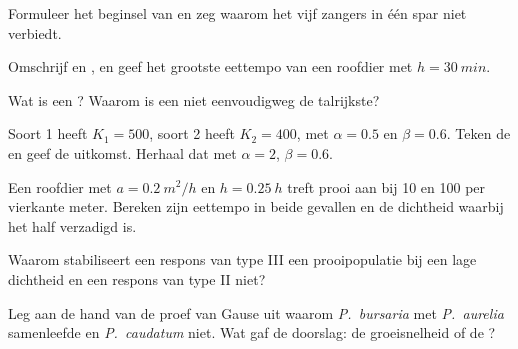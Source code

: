 \begin{exercise}[$\star$]\label{exo:b1:species-interactions:2}
Formuleer het beginsel van  en zeg waarom het vijf
zangers in één spar niet verbiedt.
\end{exercise}

\begin{exercise}[$\star$]\label{exo:b1:species-interactions:3}
Omschrijf  en , en geef het grootste eettempo van een
roofdier met $h = \qty{30}{min}$.
\end{exercise}

\begin{exercise}[$\star$]\label{exo:b1:species-interactions:4}
Wat is een ? Waarom is een  niet eenvoudigweg
de talrijkste?
\end{exercise}

\begin{exercise}[$\star\star$]\label{exo:b1:species-interactions:5}
Soort 1 heeft $K_1 = 500$, soort 2 heeft $K_2 = 400$, met $\alpha =
0.5$ en $\beta = 0.6$. Teken de  en geef de uitkomst. Herhaal dat
met $\alpha = 2$, $\beta = 0.6$.
\end{exercise}

\begin{exercise}[$\star\star$]\label{exo:b1:species-interactions:6}
Een roofdier met $a = \qty{0.2}{m^2/h}$ en $h = \qty{0.25}{h}$ treft prooi
aan bij \qty{10}{} en \qty{100}{} per vierkante meter. Bereken zijn eettempo
in beide gevallen en de dichtheid waarbij het half verzadigd is.
\end{exercise}

\begin{exercise}[$\star\star$]\label{exo:b1:species-interactions:7}
Waarom stabiliseert een respons van type III een prooipopulatie bij een lage
dichtheid en een respons van type II niet?
\end{exercise}

\begin{exercise}[$\star\star$]\label{exo:b1:species-interactions:8}
Leg aan de hand van de proef van Gause uit waarom \emph{P.~bursaria} met
\emph{P.~aurelia} samenleefde en \emph{P.~caudatum} niet. Wat gaf de
doorslag: de groeisnelheid of de ?
\end{exercise}

